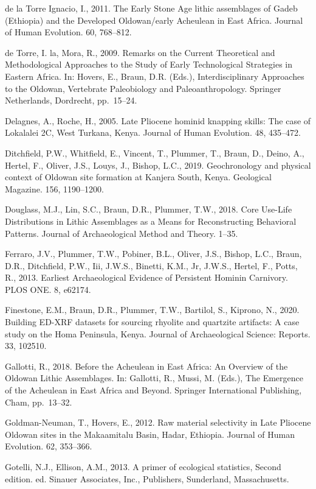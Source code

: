 \documentclass[]{elsarticle} %
\begin{document}
de la Torre Ignacio, I., 2011. The Early Stone Age lithic assemblages of
Gadeb (Ethiopia) and the Developed Oldowan/early Acheulean in East
Africa. Journal of Human Evolution. 60, 768--812.

de Torre, I. la, Mora, R., 2009. Remarks on the Current Theoretical and
Methodological Approaches to the Study of Early Technological Strategies
in Eastern Africa. In: Hovers, E., Braun, D.R. (Eds.), Interdisciplinary
Approaches to the Oldowan, Vertebrate Paleobiology and
Paleoanthropology. Springer Netherlands, Dordrecht, pp.~15--24.

Delagnes, A., Roche, H., 2005. Late Pliocene hominid knapping skills:
The case of Lokalalei 2C, West Turkana, Kenya. Journal of Human
Evolution. 48, 435--472.

Ditchfield, P.W., Whitfield, E., Vincent, T., Plummer, T., Braun, D.,
Deino, A., Hertel, F., Oliver, J.S., Louys, J., Bishop, L.C., 2019.
Geochronology and physical context of Oldowan site formation at Kanjera
South, Kenya. Geological Magazine. 156, 1190--1200.

Douglass, M.J., Lin, S.C., Braun, D.R., Plummer, T.W., 2018. Core
Use-Life Distributions in Lithic Assemblages as a Means for
Reconstructing Behavioral Patterns. Journal of Archaeological Method and
Theory. 1--35.

Ferraro, J.V., Plummer, T.W., Pobiner, B.L., Oliver, J.S., Bishop, L.C.,
Braun, D.R., Ditchfield, P.W., Iii, J.W.S., Binetti, K.M., Jr, J.W.S.,
Hertel, F., Potts, R., 2013. Earliest Archaeological Evidence of
Persistent Hominin Carnivory. PLOS ONE. 8, e62174.

Finestone, E.M., Braun, D.R., Plummer, T.W., Bartilol, S., Kiprono, N.,
2020. Building ED-XRF datasets for sourcing rhyolite and quartzite
artifacts: A case study on the Homa Peninsula, Kenya. Journal of
Archaeological Science: Reports. 33, 102510.

Gallotti, R., 2018. Before the Acheulean in East Africa: An Overview of
the Oldowan Lithic Assemblages. In: Gallotti, R., Mussi, M. (Eds.), The
Emergence of the Acheulean in East Africa and Beyond. Springer
International Publishing, Cham, pp.~13--32.

Goldman-Neuman, T., Hovers, E., 2012. Raw material selectivity in Late
Pliocene Oldowan sites in the Makaamitalu Basin, Hadar, Ethiopia.
Journal of Human Evolution. 62, 353--366.

Gotelli, N.J., Ellison, A.M., 2013. A primer of ecological statistics,
Second edition. ed. Sinauer Associates, Inc., Publishers, Sunderland,
Massachusetts.
\end{document}
